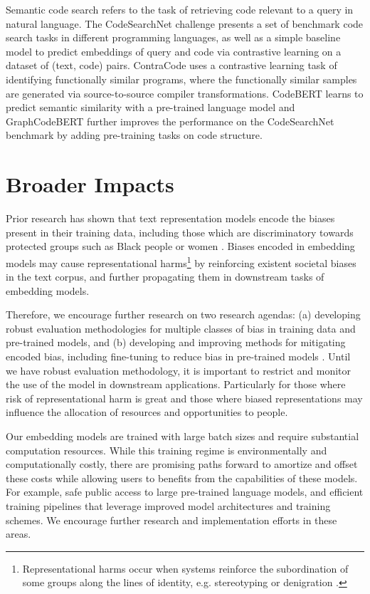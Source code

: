\documentclass[nohyperref]{article}
\begin{document}
\begin{table}[]
Semantic code search refers to the task of retrieving code relevant to a query in natural language. The CodeSearchNet challenge \cite{codesearchnet} presents a set of benchmark code search tasks in different programming languages, as well as a simple baseline model to predict embeddings of query and code via contrastive learning on a dataset of (text, code) pairs. ContraCode  \cite{Jain} uses a contrastive learning task of identifying functionally similar programs, where the functionally similar samples are generated via source-to-source compiler transformations. CodeBERT \cite{codebert} learns to predict semantic similarity with a pre-trained language model and GraphCodeBERT \cite{Guo} further improves the performance on the CodeSearchNet benchmark by adding pre-training tasks on code structure. 

\section{Broader Impacts}
Prior research has shown that text representation models encode the biases present in their training data, including those which are discriminatory towards protected groups such as Black people or women \cite{Bolukbasi,Caliskan, May,Zhao,Rudinger}. Biases encoded in embedding models may cause representational harms\footnote{ Representational harms occur when systems reinforce the subordination of some groups along the lines of identity, e.g. stereotyping or denigration \cite{Crawford}.} by reinforcing existent societal biases in the text corpus, and further propagating them in downstream tasks of embedding models. 

Therefore, we encourage further research on two research agendas: (a) developing robust evaluation methodologies for multiple classes of bias in training data and pre-trained models, and (b) developing and improving methods for mitigating encoded bias, including fine-tuning to reduce bias in pre-trained models \cite{Caliskan,May,Bolukbasi,Liang,parkbias, Solaiman}. Until we have robust evaluation methodology, it is important to restrict and monitor the use of the model in downstream applications. Particularly for those where risk of representational harm is great and those where biased representations may influence the allocation of resources and opportunities to people.

Our embedding models are trained with large batch sizes and require substantial computation resources. While this training regime is environmentally and computationally costly, there are promising paths forward to amortize and offset these costs while allowing users to benefits from the capabilities of these models. For example, safe public access to large pre-trained language models, and efficient training pipelines that leverage improved model architectures and training schemes. We encourage further research and implementation efforts in these areas.




\end{table}
\end{document}
